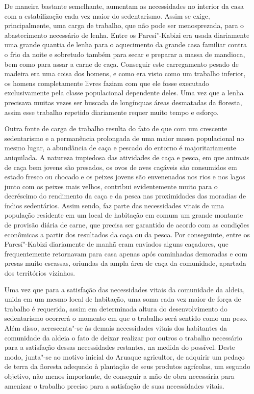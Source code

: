 De maneira bastante semelhante, aumentam as necessidades no interior da
casa com a estabilização cada vez maior do sedentarismo. Assim se exige,
principalmente, uma carga de trabalho, que não pode ser menosprezada,
para o abastecimento necessário de lenha. Entre os Paresí"-Kabizi era
usada diariamente uma grande quantia de lenha para o aquecimento da
grande casa familiar contra o frio da noite e sobretudo também para
secar e preparar a massa de mandioca, bem como para assar a carne de
caça. Conseguir este carregamento pesado de madeira era uma coisa dos
homens, e como era visto como um trabalho inferior, os homens
completamente livres faziam com que ele fosse executado exclusivamente
pela classe populacional dependente deles. Uma vez que a lenha
precisava muitas vezes ser buscada de longínquas áreas desmatadas da
floresta, assim esse trabalho repetido diariamente requer muito tempo e
esforço.

Outra fonte de carga de trabalho resulta do fato de que com um crescente
sedentarismo e a permanência prolongada de uma maior massa populacional
no mesmo lugar, a abundância de caça e pescado do entorno é
majoritariamente aniquilada. A natureza impiedosa das atividades de caça
e pesca, em que animais de caça bem jovens são presados, os ovos de
aves caçáveis são consumidos em estado fresco ou chocado e os peixes
jovens são envenenados nos rios e nos lagos junto com os peixes mais
velhos, contribui evidentemente muito para o decréscimo do rendimento da
caça e da pesca nas proximidades das moradias de índios sedentários.
Assim sendo, faz parte das necessidades vitais de uma população
residente em um local de habitação em comum um grande montante de
provisão diária de carne, que precisa ser garantido de acordo com as
condições econômicas a partir dos resultados da caça ou da pesca. Por
conseguinte, entre os Paresí"-Kabizi diariamente de manhã eram enviados
alguns caçadores, que frequentemente retornavam para casa apenas após
caminhadas demoradas e com presas muito escassas, oriundas da ampla
área de caça da comunidade, apartada dos territórios vizinhos.

Uma vez que para a satisfação das necessidades vitais da comunidade da
aldeia, unida em um mesmo local de habitação, uma soma cada vez maior de
força de trabalho é requerida, assim em determinada altura do
desenvolvimento do sedentarismo ocorrerá o momento em que o trabalho
será sentido como um peso. Além disso, acrescenta"-se às demais
necessidades vitais dos habitantes da comunidade da aldeia o fato de
deixar realizar por outros o trabalho necessário para a satisfação
dessas necessidades restantes, na medida do possível. Deste modo,
junta"-se ao motivo inicial do Aruaque agricultor, de adquirir um pedaço
de terra da floresta adequado à plantação de seus produtos agrícolas, um
segundo objetivo, não menos importante, de conseguir a mão de obra
necessária para amenizar o trabalho preciso para a satisfação de suas
necessidades vitais.

